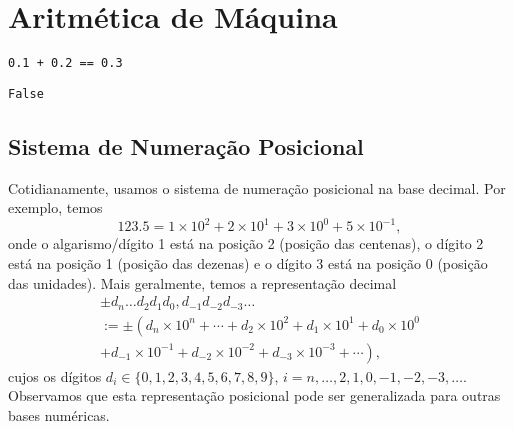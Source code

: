 
\chapter{Aritmética de Máquina}\label{cap_aritm}

\begin{lstlisting}
0.1 + 0.2 == 0.3
\end{lstlisting}

\begin{verbatim}
False
\end{verbatim}

\section{Sistema de Numeração Posicional}\label{cap_aritm_sec_sisnumpos}

Cotidianamente, usamos o sistema de numeração posicional na base decimal. Por exemplo, temos
\begin{equation}
  123.5 = 1\times 10^2 + 2\times 10^1 + 3\times 10^0 + 5\times 10^{-1},
\end{equation}
onde o algarismo/dígito 1 está na posição 2 (posição das centenas), o dígito 2 está na posição 1 (posição das dezenas) e o dígito 3 está na posição 0 (posição das unidades). Mais geralmente, temos a representação decimal
\begin{gather}
  \pm d_n\ldots d_2d_1d_0,d_{-1}d_{-2}d_{-3}\ldots \\
  := \pm \left(d_n\times 10^n + \cdots + d_2\times 10^2 + d_1\times 10^1 + d_0\times 10^0\right. \\
      \left. + d_{-1}\times 10^{-1} + d_{-2}\times 10^{-2} + d_{-3}\times 10^{-3} + \cdots\right),
\end{gather}
cujos os dígitos $d_i \in \{0, 1, 2, 3, 4, 5, 6, 7, 8, 9\}$, $i=n, \dotsc, 2, 1, 0, -1, -2, -3, \ldots$. Observamos que esta representação posicional pode ser generalizada para outras bases numéricas.

